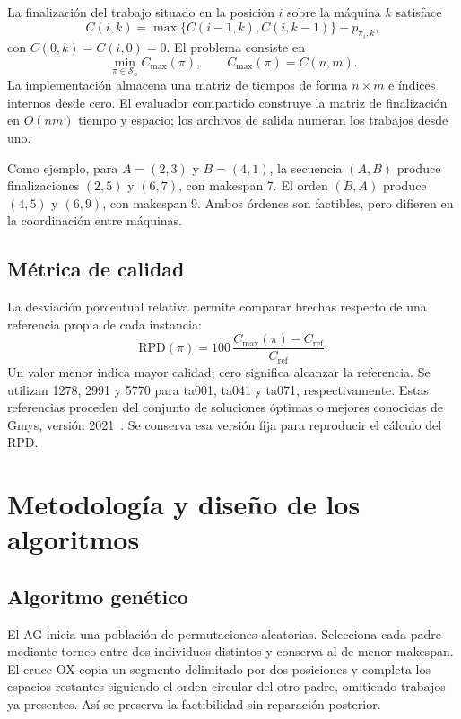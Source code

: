 \documentclass[journal]{IEEEtran}
\newcommand{\RPD}{\mathrm{RPD}}
\begin{document}
La finalización del trabajo situado en la posición $i$ sobre la máquina $k$ satisface
\begin{equation}
C(i,k)=\max\{C(i-1,k),C(i,k-1)\}+p_{\pi_i,k},
\label{eq:recurrencia}
\end{equation}
con $C(0,k)=C(i,0)=0$. El problema consiste en
\begin{equation}
\min_{\pi\in\mathcal{S}_n} C_{\max}(\pi),\qquad C_{\max}(\pi)=C(n,m).
\end{equation}
La implementación almacena una matriz de tiempos de forma $n\times m$ e índices internos desde cero. El evaluador compartido construye la matriz de finalización en $O(nm)$ tiempo y espacio; los archivos de salida numeran los trabajos desde uno.

Como ejemplo, para $A=(2,3)$ y $B=(4,1)$, la secuencia $(A,B)$ produce finalizaciones $(2,5)$ y $(6,7)$, con makespan 7. El orden $(B,A)$ produce $(4,5)$ y $(6,9)$, con makespan 9. Ambos órdenes son factibles, pero difieren en la coordinación entre máquinas.

\subsection{Métrica de calidad}
La desviación porcentual relativa permite comparar brechas respecto de una referencia propia de cada instancia:
\begin{equation}
\RPD(\pi)=100\,\frac{C_{\max}(\pi)-C_{\mathrm{ref}}}{C_{\mathrm{ref}}}.
\label{eq:rpd}
\end{equation}
Un valor menor indica mayor calidad; cero significa alcanzar la referencia. Se utilizan 1278, 2991 y 5770 para ta001, ta041 y ta071, respectivamente. Estas referencias proceden del conjunto de soluciones óptimas o mejores conocidas de Gmys, versión 2021~\cite{Gmys2021}. Se conserva esa versión fija para reproducir el cálculo del RPD.

\section{Metodología y diseño de los algoritmos}
\label{sec:metodo}
\subsection{Algoritmo genético}
El AG inicia una población de permutaciones aleatorias. Selecciona cada padre mediante torneo entre dos individuos distintos y conserva al de menor makespan. El cruce OX copia un segmento delimitado por dos posiciones y completa los espacios restantes siguiendo el orden circular del otro padre, omitiendo trabajos ya presentes. Así se preserva la factibilidad sin reparación posterior.
\end{document}
